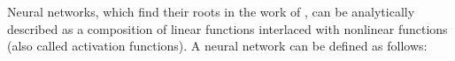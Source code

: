%


Neural networks, which find their roots in the work of \citet{mcculloch1943logical,rosenblatt1958perceptron}, can be analytically described as a composition of linear functions interlaced with nonlinear functions (also called activation functions).
A neural network can be defined as follows:

